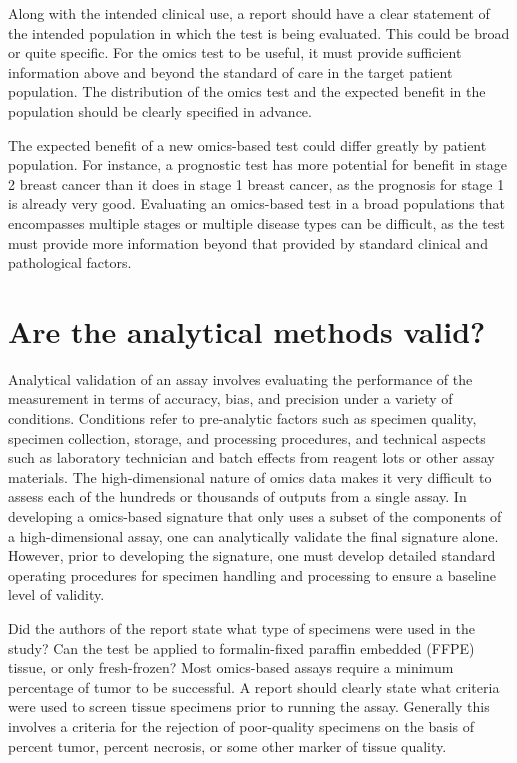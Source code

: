 \documentclass[11pt]{article}
\begin{document}
Along with the intended clinical use, a report should have a clear
statement of the intended population in which the test is being
evaluated. This could be broad or quite specific. For the omics test to
be useful, it must provide sufficient information above and beyond the
standard of care in the target patient population. The distribution of
the omics test and the expected benefit in the population should be
clearly specified in advance.

The expected benefit of a new omics-based test could differ greatly by
patient population. For instance, a prognostic test has more potential
for benefit in stage 2 breast cancer than it does in stage 1 breast
cancer, as the prognosis for stage 1 is already very good. Evaluating an
omics-based test in a broad populations that encompasses multiple stages
or multiple disease types can be difficult, as the test must provide
more information beyond that provided by standard clinical and
pathological factors.

\section{Are the analytical methods
valid?}\label{are-the-analytical-methods-valid}

Analytical validation of an assay involves evaluating the performance of
the measurement in terms of accuracy, bias, and precision under a
variety of conditions. Conditions refer to pre-analytic factors such as
specimen quality, specimen collection, storage, and processing
procedures, and technical aspects such as laboratory technician and
batch effects from reagent lots or other assay materials. The
high-dimensional nature of omics data makes it very difficult to assess
each of the hundreds or thousands of outputs from a single assay. In
developing a omics-based signature that only uses a subset of the
components of a high-dimensional assay, one can analytically validate
the final signature alone. However, prior to developing the signature,
one must develop detailed standard operating procedures for specimen
handling and processing to ensure a baseline level of validity.

Did the authors of the report state what type of specimens were used in
the study? Can the test be applied to formalin-fixed paraffin embedded
(FFPE) tissue, or only fresh-frozen? Most omics-based assays require a
minimum percentage of tumor to be successful. A report should clearly
state what criteria were used to screen tissue specimens prior to
running the assay. Generally this involves a criteria for the rejection
of poor-quality specimens on the basis of percent tumor, percent
necrosis, or some other marker of tissue quality.
\end{document}
